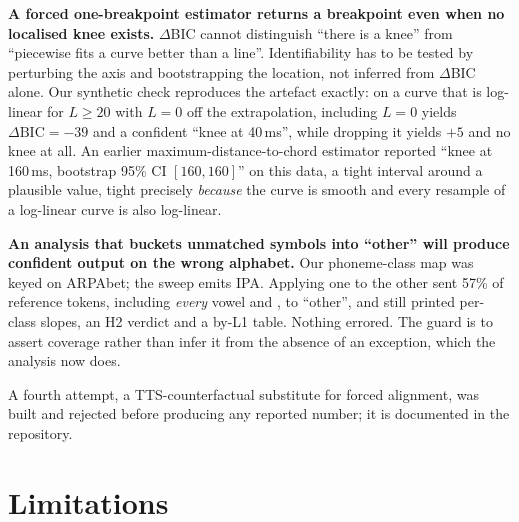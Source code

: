 \documentclass[journal]{IEEEtran}
\begin{document}
\textbf{A forced one-breakpoint estimator returns a breakpoint even when no localised knee
exists.} $\Delta$BIC cannot distinguish ``there is a knee'' from ``piecewise
fits a curve better than a line''. Identifiability has to be tested by
perturbing the axis and bootstrapping the location, not inferred from
$\Delta$BIC alone. Our synthetic check reproduces the artefact exactly: on a
curve that is log-linear for $L\geq20$ with $L{=}0$ off the extrapolation,
including $L{=}0$ yields $\Delta\mathrm{BIC}=-39$ and a confident ``knee at
40\,ms'', while dropping it yields $+5$ and no knee at all. An earlier
maximum-distance-to-chord estimator reported ``knee at 160\,ms, bootstrap 95\%
CI $[160,160]$'' on this data, a tight interval around a plausible value,
tight precisely \emph{because} the curve is smooth and every resample of a
log-linear curve is also log-linear.

\textbf{An analysis that buckets unmatched symbols into ``other'' will produce
confident output on the wrong alphabet.} Our phoneme-class map was keyed on
ARPAbet; the sweep emits IPA. Applying one to the other sent 57\% of reference
tokens, including \emph{every} vowel and , to ``other'',
and still printed per-class slopes, an H2 verdict and a by-L1 table. Nothing
errored. The guard is to assert coverage rather than infer it from the absence
of an exception, which the analysis now does.

A fourth attempt, a TTS-counterfactual substitute for forced alignment, was
built and rejected before producing any reported number; it is documented in
the repository.

\section{Limitations}
\label{sec:remaining}
\end{document}
